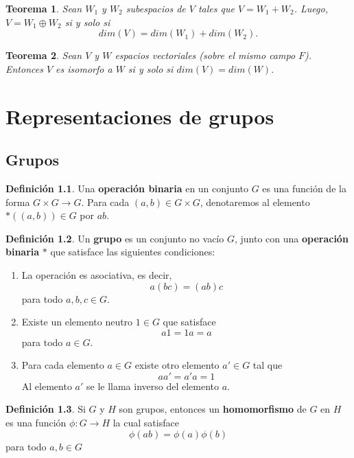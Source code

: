 \documentclass[12pt]{book}
\newtheorem{theorem}{Teorema}[section]
\theoremstyle{definition}
\newtheorem{definition}[theorem]{Definición}
\newcounter{in}
\newcounter{ini}
\begin{document}
{\begin{theorem}
  Sean $W_{1}$ y $W_{2}$ subespacios de $V$ tales que
  $V=W_{1}+W_{2}$. Luego, $V=W_{1}\oplus W_{2}$ si y solo si 
  $$dim(V)=dim(W_{1})+dim(W_{2}).$$
\end{theorem}

\begin{theorem}
  Sean $V$ y $W$ espacios vectoriales (sobre el mismo campo
  $F$). Entonces $V$ es isomorfo a $W$ si y solo si $dim (V)=dim(W).$ 
\end{theorem}

\chapter{Representaciones de grupos}
\label{cha:primer-capitulo}

\section{Grupos}

\begin{definition}
  Una \textbf{operación binaria} en un conjunto $G$ es una función
  de la forma $G  \times G \rightarrow G$. Para cada $(a,b)\in G
  \times G$, denotaremos al elemento $*((a,b))\in G$ por $ab$. 
\end{definition} 

\begin{definition} 
  Un \textbf{grupo} es un conjunto no vacío $G$, junto con una
  \textbf{operación binaria} $*$ que satisface las siguientes condiciones:
    \begin{enumerate}
    \item La operación es asociativa, es decir, $$a(bc)=(ab)c$$ para todo $a,b,c \in G$.
    \item Existe un elemento neutro $1 \in G$ que
      satisface $$a1=1a=a$$ para todo $a \in G$.
    \item Para cada elemento $a \in G$ existe otro elemento $a' \in G$
      tal que $$aa'=a'a=1$$ Al elemento $a'$ se le llama inverso del elemento $a$.
    \end{enumerate}
\end{definition}

\begin{definition}
  Si $G$ y $H$ son grupos, entonces un \textbf{homomorfismo} de $G$
  en $H$ es una función $\phi:G\rightarrow H$ la cual
  satisface $$\phi(ab)=\phi(a)\phi(b)$$ para todo $a,b \in G$
\end{definition}

}
\end{document}
